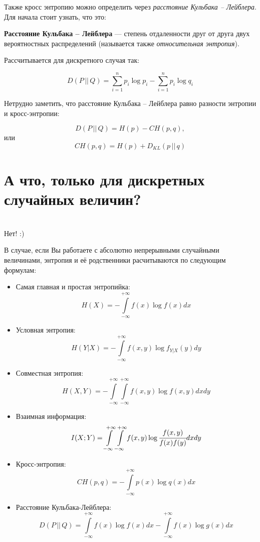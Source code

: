 Также кросс энтропию можно определить через \textit{расстояние Кульбака -- Лейблера}. Для начала стоит узнать, что это:

\begin{siderules}
    \textbf{Расстояние Кульбака -- Лейблера} --- степень отдаленности друг от друга двух вероятностных распределений (называется также \textit{относительная энтропия}). \end{siderules}
    
    Рассчитывается для дискретного случая так:

    \[D(P\, ||\, Q)=\sum\limits_{i=1}^n p_i\log p_i-\sum\limits_{i=1}^n p_i\log q_i\]

Нетрудно заметить, что расстояние Кульбака -- Лейблера равно разности энтропии и кросс-энтропии:

\[D(P\, ||\, Q)=H(p)-CH(p,q),\]
или
\[CH(p, q)=H(p)+D_{KL}(p\, || \, q)\]

\section*{А что, только для дискретных случайных величин?}~\
\\

Нет! :)

В случае, если Вы работаете с абсолютно непрерывными случайными величинами, энтропия и её родственники расчитываются по следующим формулам:

\begin{itemize}
    \item Самая главная и простая энтропийка:
    \[H(X)=-\int\limits_{-\infty}^{+\infty} f(x)\log f(x)dx \]
    \item Условная энтропия:
    \[H(Y|X)=-\int\limits_{-\infty}^{+\infty} f(x, y)\log f_{Y|X}(y)dy \]
    \item Совместная энтропия:
    \[H(X, Y)=-\int\limits_{-\infty}^{+\infty} \int\limits_{-\infty}^{+\infty} f(x, y)\log f(x, y)dxdy \]
    \item Взаимная информация:
    \[I(X; Y)=\int\limits_{-\infty}^{+\infty} \int\limits_{-\infty}^{+\infty} f(x, y) \log \cfrac{f(x, y)}{f(x)f(y)}dxdy \]
    \item Кросс-энтропия:
    \[CH(p, q)=-\int\limits_{-\infty}^{+\infty}p(x)\log q(x) dx \]
    \item Расстояние Кульбака-Лейблера:
    \[D(P\, ||\, Q)=\int\limits_{-\infty}^{+\infty} f(x)\log f(x)dx -\int\limits_{-\infty}^{+\infty} f(x)\log g(x)dx  \]
\end{itemize}

